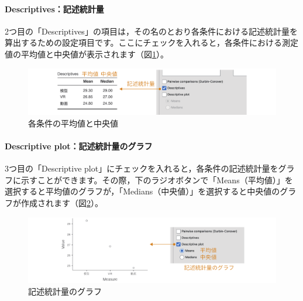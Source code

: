 \documentclass[
  12pt,
  a5jpaper,
  lualatex, ja=standard]{bxjsbook}
\begin{document}
\hypertarget{descriptivesux8a18ux8ff0ux7d71ux8a08ux91cf-1}{%
\paragraph*{Descriptives：記述統計量}\label{descriptivesux8a18ux8ff0ux7d71ux8a08ux91cf-1}}

2つ目の「Descriptives」の項目は，その名のとおり各条件における記述統計量を算出するための設定項目です。ここにチェックを入れると，各条件における測定値の平均値と中央値が表示されます（図\ref{fig:ANOVA-friedman-descriptives}）。

\begin{figure}[!ht]

{\centering \includegraphics[width=1\linewidth]{images/ANOVA/friedman-descriptives} 

}

\caption{各条件の平均値と中央値}\label{fig:ANOVA-friedman-descriptives}
\end{figure}

\hypertarget{descriptive-plotux8a18ux8ff0ux7d71ux8a08ux91cfux306eux30b0ux30e9ux30d5}{%
\paragraph*{Descriptive plot：記述統計量のグラフ}\label{descriptive-plotux8a18ux8ff0ux7d71ux8a08ux91cfux306eux30b0ux30e9ux30d5}}

3つ目の「Descriptive plot」にチェックを入れると，各条件の記述統計量をグラフに示すことができます。その際，下のラジオボタンで「Means（平均値）」を選択すると平均値のグラフが，「Medians（中央値）」を選択すると中央値のグラフが作成されます（図\ref{fig:ANOVA-friedman-descriptive-plot}）。

\begin{figure}[!ht]

{\centering \includegraphics[width=1\linewidth]{images/ANOVA/friedman-descriptive-plot} 

}

\caption{記述統計量のグラフ}\label{fig:ANOVA-friedman-descriptive-plot}
\end{figure}
\end{document}
